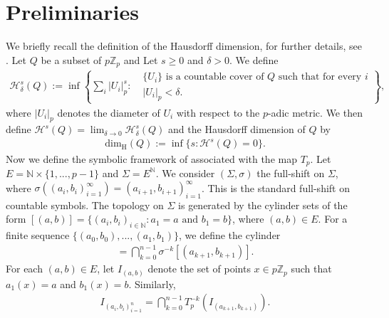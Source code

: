 \documentclass[11pt]{amsart}
\theoremstyle{remark}
\numberwithin{equation}{section}
\newcommand{\N}{\mathbb{N}}
\newcommand{\Z}{\mathbb{Z}}
\newcommand{\Zp}{\mathbb{Z}_p}
\begin{document}
\section{Preliminaries}
We briefly recall the definition of the Hausdorff dimension, for further details, see \cite[Section 2.2]{fa}. Let $Q$ be a subset of  $p\Zp$ and Let $s\geq 0$ and $\delta>0$. We define 
\begin{align*}
    \mathcal{H}^{s}_{\delta}(Q):=\inf\left\{\sum_{i}|U_{i}|_{p}^{s}:\begin{array}{c}
         \text{ $\{U_{i}\}$ is a countable cover of $Q$ such that for every $i$}  \\
         \text{ $|U_{i}|_{p}<\delta$.}
    \end{array} \right\}, 
\end{align*} where $|U_{i}|_{p}$ denotes the diameter of $U_{i}$ with respect to the $p$-adic metric. We then define $\mathcal{H}^{s}(Q)=\lim_{\delta\rightarrow 0}\mathcal{H}^{s}_{\delta}(Q)$ and the Hausdorff dimension of $Q$ by
\begin{align}\label{HAUSDORFF}
   \mathrm{dim}_{\mathrm{H}}(Q):= \inf\{s:\mathcal{H}^{s}(Q)=0\}.
\end{align} Now we define the symbolic framework of associated with the map $T_{p}$. Let $E=\N \times \{1,...,p-1\}$ and $\Sigma=E^\N$. We consider  $(\Sigma,\sigma)$ the full-shift on $\Sigma$, where $\sigma\left((a_{i},b_{i})_{i=1}^{\infty}\right)=(a_{i+1},b_{i+1})_{i=1}^{\infty}$. This is the standard full-shift on countable symbols. The topology on $\Sigma$ is generated by the cylinder sets of the form $[(a,b)]=\{(a_{i},b_{i})_{i\in \N}:a_{1}=a \text{ and $b_{1}=b$}\}$, where $(a,b)\in E$. For a finite sequence $\{(a_0,b_0),...,(a_1,b_1)\}$, we define the cylinder
\begin{align*}
    [(a_{1},b_{1}),...,(a_{n},b_{n})]=\bigcap^{n-1}_{k=0}\sigma^{-k}[(a_{k+1},b_{k+1})].
\end{align*} For each $(a,b)\in E$, let $I_{(a,b)}$ denote the set of points $x\in p\Z_{p}$ such that $a_{1}(x)=a$ and $b_{1}(x)=b$. Similarly,
\begin{align*}
    I_{(a_{i},b_{i})^{n}_{i=1}}=\bigcap_{k=0}^{n-1}T_{p}^{-k}\left(I_{(a_{k+1},b_{k+1})}\right).
\end{align*} 
\end{document}
